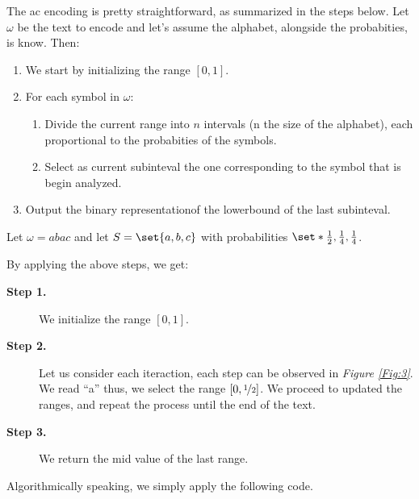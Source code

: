 \documentclass{subfiles}
\begin{document}
    The \gls{ac} encoding is pretty straightforward,
        as summarized in the steps below.
    Let \(\omega\) be the text to encode and let's assume the alphabet,
        alongside the probabities, is know. Then:
        \begin{enumerate}
            \item We start by initializing the range \([0, 1]\).
            \item For each symbol in \(\omega\):
                \begin{enumerate}
                    \item Divide the current range into \(n\) intervals 
                        (n the size of the alphabet), 
                        each proportional to the probabities of the symbols.
                    \item Select as current subinteval the one corresponding to the symbol
                        that is begin analyzed.
                \end{enumerate}
            \item Output the binary representation\footnotemark[1] of the lowerbound of the last subinteval.
        \end{enumerate}
        \begin{example*}
            Let \(\omega = abac\) and let \(S = \set{a, b, c}\)
            with probabilities \(\set*{\tfrac{1}{2}, \tfrac{1}{4}, \tfrac{1}{4}}\).

            By applying the above steps, we get:
            \begin{description}
                \item [\textbf{Step 1.}] We initialize the range \([0, 1]\).
                \item [\textbf{Step 2.}] Let us consider each iteraction,
                    each step can be observed in \emph{Figure \ref{Fig:3}}.
                    We read ``a'' thus, we select the range \([0, \nicefrac{1}{2}]\).
                    We proceed to updated the ranges, 
                    and repeat the process until the end of the text.
                    

                \item [\textbf{Step 3.}] We return the mid value of the last range.
            \end{description}
        \end{example*}
        \clearpage
        Algorithmically speaking, we simply apply the following code.
        
\end{document}
